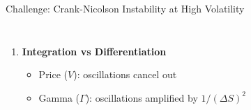 \documentclass[aspectratio=169]{beamer}
\begin{document}
\begin{frame}{Challenge: Crank-Nicolson Instability at High Volatility}
\begin{columns}
\begin{enumerate}
    \vspace{0.3em}
    \item \textbf{Integration vs Differentiation}
    \begin{itemize}
        \item Price ($V$): oscillations cancel out
        \item Gamma ($\Gamma$): oscillations amplified by $1/(\Delta S)^2$
    \end{itemize}
\end{enumerate}
\end{columns}

\end{frame}


\end{document}
